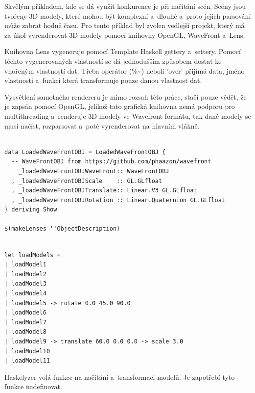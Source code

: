 \documentclass[male, czech]{kithesis}
\newenvironment{code}{\captionsetup{type=listing}}{}
\begin{document}
Skvělým příkladem, kde se dá využit konkurence je při načítání 
scén. Scény jsou tvořeny 3D modely, které mohou být komplexní
a~dlouhé a~proto jejich parsování může zabrat hodně času. Pro 
tento příklad byl zvolen vedlejší projekt, který má za úkol 
vyrenderovat 3D modely pomocí knihovny OpenGL, WaveFront a~Lens. 

Knihovna Lens vygeneruje pomocí Template Haskell gettery a~settery.
Pomocí těchto vygenerovaných vlastností se dá jednodušším způsobem 
dostat ke vnořeným vlastností dat. 
Třeba operátor (\%\textasciitilde) neboli 'over' přijímá data,
jméno vlastnosti
a~funkci která transformuje pouze danou vlastnost dat.

Vysvětlení samotného rendereru je mimo rozsah této práce, stačí 
pouze vědět, že je zapsán pomocí OpenGL, jelikož tato grafická 
knihovna nemá podporu pro multithreading a~renderuje 
3D modely ve Wavefront formátu, 
tak dané modely se musí načíst,
rozparsovat
a~poté vyrenderovat na hlavním vlákně.

\newpage

\begin{code}
\begin{verbatim}

data LoadedWaveFrontOBJ = LoadedWaveFrontOBJ {
  -- WaveFrontOBJ from https://github.com/phaazon/wavefront
    _loadedWaveFrontOBJWaveFront:: WaveFrontOBJ
  , _loadedWaveFrontOBJScale    :: GL.GLfloat
  , _loadedWaveFrontOBJTranslate:: Linear.V3 GL.GLfloat
  , _loadedWaveFrontOBJRotation :: Linear.Quaternion GL.GLfloat
} deriving Show

$(makeLenses ''ObjectDescription)

\end{verbatim}
\end{code}

\begin{code}
\begin{verbatim}

let loadModels = 
| loadModel1 
| loadModel2 
| loadModel3 
| loadModel4 
| loadModel5 -> rotate 0.0 45.0 90.0
| loadModel6 
| loadModel7 
| loadModel8 
| loadModel9 -> translate 60.0 0.0 0.0 -> scale 3.0
| loadModel10 
| loadModel11 

\end{verbatim}
\end{code}

Haskelyzer volá funkce na načítání a~transformaci modelů.
Je zapotřebí tyto funkce nadefinovat.
\end{document}
